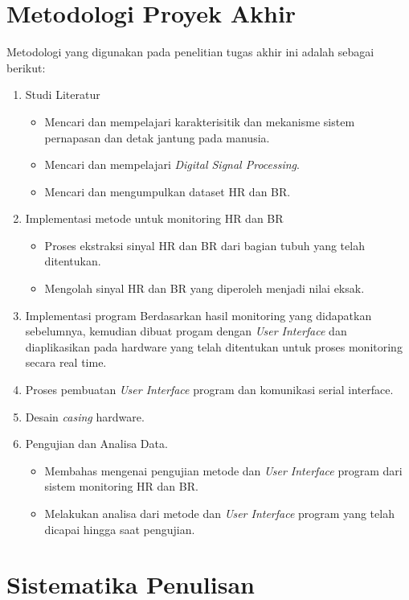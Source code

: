 \section{Metodologi Proyek Akhir}  %
Metodologi yang digunakan pada penelitian tugas akhir ini adalah sebagai berikut:
\newline
\begin{enumerate}
	\item Studi Literatur
	\begin{itemize}
		\item Mencari dan mempelajari karakterisitik dan mekanisme sistem pernapasan dan detak jantung pada manusia.
		\item Mencari dan mempelajari \textit{Digital Signal Processing}.
		\item Mencari dan mengumpulkan dataset HR dan BR.
	\end{itemize}
	\item Implementasi metode untuk monitoring HR dan BR
	\begin{itemize}
		\item Proses ekstraksi sinyal HR dan BR dari bagian tubuh yang telah ditentukan.
		\item Mengolah sinyal HR dan BR yang diperoleh menjadi nilai eksak.
	\end{itemize}
	\item Implementasi program 
	Berdasarkan hasil monitoring yang didapatkan sebelumnya, kemudian dibuat progam dengan \textit{User Interface} dan diaplikasikan pada hardware yang telah ditentukan untuk proses monitoring secara real time. 
	\item Proses pembuatan \textit{User Interface} program dan komunikasi serial interface.
	\item Desain \textit{casing} hardware.
	\item Pengujian dan Analisa Data.
	\begin{itemize}
		\item Membahas mengenai pengujian metode dan \textit{User Interface} program dari sistem monitoring HR dan BR. 
		\item Melakukan analisa dari metode dan \textit{User Interface} program yang telah dicapai hingga saat pengujian.
	\end{itemize}
\end{enumerate}

\section{Sistematika Penulisan}  %

